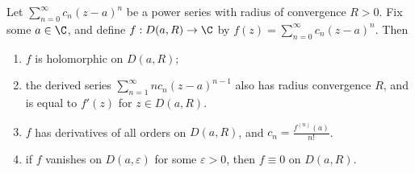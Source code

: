\begin{theorem}
    Let $\sum_{n = 0}^{\infty} c_n(z - a)^n$ be a power series with radius of convergence $R > 0$. Fix some $a \in \C$, and define $f: D(a, R) \rightarrow \C$ by $f(z) = \sum_{n = 0}^{\infty} c_n(z - a)^n$. Then
    \begin{enumerate}[label=(\roman*)]
        \item $f$ is holomorphic on $D(a, R)$;
        \item the derived series $\sum_{n = 1}^{\infty} n c_n (z - a)^{n - 1}$ also has radius convergence $R$, and is equal to $f'(z)$ for $z \in D(a, R)$.
        \item $f$ has derivatives of all orders on $D(a, R)$, and $c_n = \frac{f^{(n)}(a)}{n!}$.
        \item if $f$ vanishes on $D(a, \varepsilon)$ for some $\varepsilon > 0$, then $f \equiv 0$ on $D(a, R)$.
    \end{enumerate}
\end{theorem}

